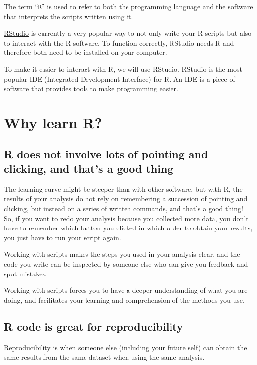 \documentclass[]{book}
\begin{document}
The term ``\texttt{R}'' is used to refer to both the programming
language and the software that interprets the scripts written using it.

\href{https://rstudio.com}{RStudio} is currently a very popular way to
not only write your R scripts but also to interact with the R software.
To function correctly, RStudio needs R and therefore both need to be
installed on your computer.

To make it easier to interact with R, we will use RStudio. RStudio is
the most popular IDE (Integrated Development Interface) for R. An IDE is
a piece of software that provides tools to make programming easier.

\section{Why learn R?}\label{why-learn-r}

\subsection{R does not involve lots of pointing and clicking, and that's
a good
thing}\label{r-does-not-involve-lots-of-pointing-and-clicking-and-thats-a-good-thing}

The learning curve might be steeper than with other software, but with
R, the results of your analysis do not rely on remembering a succession
of pointing and clicking, but instead on a series of written commands,
and that's a good thing! So, if you want to redo your analysis because
you collected more data, you don't have to remember which button you
clicked in which order to obtain your results; you just have to run your
script again.

Working with scripts makes the steps you used in your analysis clear,
and the code you write can be inspected by someone else who can give you
feedback and spot mistakes.

Working with scripts forces you to have a deeper understanding of what
you are doing, and facilitates your learning and comprehension of the
methods you use.

\subsection{R code is great for
reproducibility}\label{r-code-is-great-for-reproducibility}

Reproducibility is when someone else (including your future self) can
obtain the same results from the same dataset when using the same
analysis.
\end{document}
